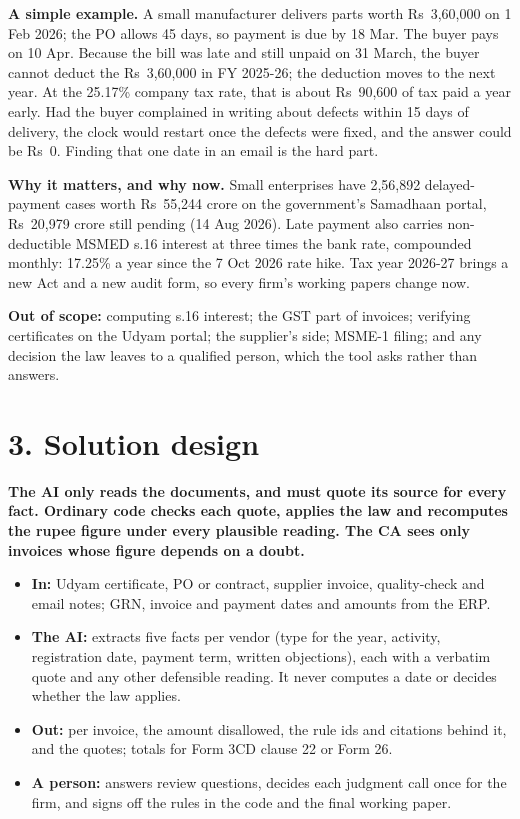 \documentclass[10pt,a4paper]{article}
\providecommand{\tightlist}{\setlength{\itemsep}{1.5pt}\setlength{\parskip}{0pt}}
\begin{document}
\textbf{A simple example.} A small manufacturer delivers parts worth Rs~3,60,000 on 1 Feb 2026; the PO allows 45 days, so payment is due by 18 Mar. The buyer pays on 10 Apr. Because the bill was late and still unpaid on 31 March, the buyer cannot deduct the Rs~3,60,000 in FY 2025-26; the deduction moves to the next year. At the 25.17\% company tax rate, that is about Rs~90,600 of tax paid a year early. Had the buyer complained in writing about defects within 15 days of delivery, the clock would restart once the defects were fixed, and the answer could be Rs~0. Finding that one date in an email is the hard part.

\textbf{Why it matters, and why now.} Small enterprises have 2,56,892 delayed-payment cases worth Rs~55,244 crore on the government's Samadhaan portal, Rs~20,979 crore still pending (14 Aug 2026). Late payment also carries non-deductible MSMED s.16 interest at three times the bank rate, compounded monthly: 17.25\% a year since the 7 Oct 2026 rate hike. Tax year 2026-27 brings a new Act and a new audit form, so every firm's working papers change now.

\textbf{Out of scope:} computing s.16 interest; the GST part of invoices; verifying certificates on the Udyam portal; the supplier's side; MSME-1 filing; and any decision the law leaves to a qualified person, which the tool asks rather than answers.

\section*{3. Solution design}

\textbf{The AI only reads the documents, and must quote its source for every fact. Ordinary code checks each quote, applies the law and recomputes the rupee figure under every plausible reading. The CA sees only invoices whose figure depends on a doubt.}

\begin{itemize}
\tightlist
\item
  \textbf{In:} Udyam certificate, PO or contract, supplier invoice, quality-check and email notes; GRN, invoice and payment dates and amounts from the ERP.
\item
  \textbf{The AI:} extracts five facts per vendor (type for the year, activity, registration date, payment term, written objections), each with a verbatim quote and any other defensible reading. It never computes a date or decides whether the law applies.
\item
  \textbf{Out:} per invoice, the amount disallowed, the rule ids and citations behind it, and the quotes; totals for Form 3CD clause 22 or Form 26.
\item
  \textbf{A person:} answers review questions, decides each judgment call once for the firm, and signs off the rules in the code and the final working paper.
\end{itemize}
\end{document}
